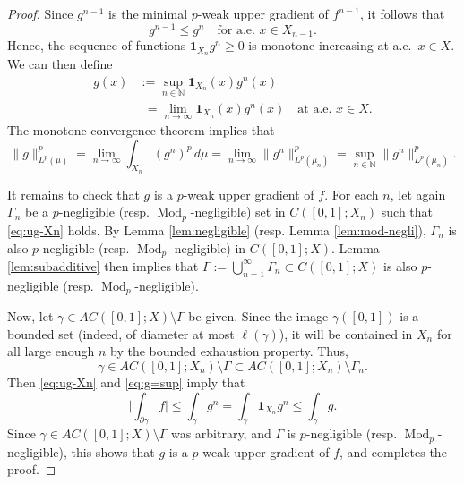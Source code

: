\documentclass[11pt]{amsart}
\theoremstyle{definition}
\theoremstyle{remark}
\numberwithin{equation}{section}
\newcommand{\Babs}[1]{\Big|#1\Big|}
\newcommand{\Norm}[2]{\|#1\|_{#2}}
\begin{document}
\begin{proof}
Since $g^{n-1}$ is the minimal $p$-weak upper gradient of $f^{n-1}$, it follows that
\begin{equation*}
  g^{n-1}\leq g^{n}\quad\text{for a.e. }x\in X_{n-1}.
\end{equation*}
Hence, the sequence of functions $\mathbf{1}_{X_n}g^n\geq 0$ is monotone increasing at a.e.\
$x\in X$. We can then define
\begin{equation}\label{eq:g=sup}
\begin{split}
  g(x)&:=\sup_{n\in\mathbb N}\mathbf{1}_{X_n}(x)g^n(x) \\
  &\phantom{:}=\lim_{n\to\infty}\mathbf{1}_{X_n}(x)g^n(x)\quad\text{at a.e. }x\in X.
\end{split}
\end{equation}
The monotone convergence theorem implies that
\begin{equation*}
  \Norm{g}{L^p(\mu)}^p
  =\lim_{n\to\infty}\int_{X_n}(g^n)^p\,d\mu
  =\lim_{n\to\infty}\Norm{g^n}{L^p(\mu_n)}^p
  =\sup_{n\in\mathbb N}\Norm{g^n}{L^p(\mu_n)}^p.
\end{equation*}

It remains to check that $g$ is a $p$-weak upper gradient of $f$. For each $n$, let again
$\Gamma_n$ be a $p$-negligible (resp. $\operatorname{Mod}_p$-negligible) set in
$C([0,1];X_n)$ such that \eqref{eq:ug-Xn} holds. By Lemma \ref{lem:negligible} (resp. Lemma
\ref{lem:mod-negli}), $\Gamma_n$ is also $p$-negligible (resp.
$\operatorname{Mod}_p$-negligible) in $C([0,1];X)$. Lemma \ref{lem:subadditive} then implies
that $\Gamma:=\bigcup_{n=1}^\infty\Gamma_n\subset C([0,1];X)$ is also $p$-negligible (resp.
$\operatorname{Mod}_p$-negligible).

Now, let $\gamma\in AC([0,1];X)\setminus\Gamma$ be given. Since the image $\gamma([0,1])$ is
a bounded set (indeed, of diameter at most $\ell(\gamma)$), it will be contained in $X_n$
for all large enough $n$ by the bounded exhaustion property. Thus,
\begin{equation*}
  \gamma\in AC([0,1];X_n)\setminus\Gamma
  \subset AC([0,1];X_n)\setminus\Gamma_n.
\end{equation*}
Then \eqref{eq:ug-Xn} and \eqref{eq:g=sup} imply that
\begin{equation*}
  \Babs{\int_{\partial\gamma}f}
  \leq\int_{\gamma}g^n
  =\int_{\gamma}\mathbf{1}_{X_n}g^n
  \leq\int_{\gamma}g.
\end{equation*}
Since $\gamma\in AC([0,1];X)\setminus\Gamma$ was arbitrary, and $\Gamma$ is $p$-negligible
(resp.  $\operatorname{Mod}_p$-negligible), this shows that $g$ is a $p$-weak upper gradient
of $f$, and completes the proof.
\end{proof}
\end{document}
